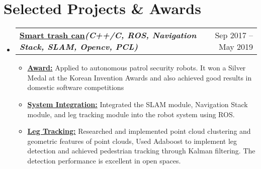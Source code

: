 \documentclass[letterpaper,11pt]{article}
\makeatletter
\newcommand{\resumeItem}[1]{
  \item\small{
    {#1 \vspace{-2pt}}
  }
}
\newcommand{\resumeProjectHeading}[2]{
    \item
    \begin{tabular*}{0.97\textwidth}{l@{\extracolsep{\fill}}r}
      \textbf{#1} & #2 \\
    \end{tabular*}\vspace{-7pt}
}
\newcommand{\resumeSubHeadingListStart}{\begin{itemize}[leftmargin=0.15in, label={}]}
\newcommand{\resumeSubHeadingListEnd}{\end{itemize}}
\newcommand{\resumeItemListStart}{\begin{itemize}}
\newcommand{\resumeItemListEnd}{\end{itemize}\vspace{-5pt}}
\makeatother
\begin{document}
\section{\textbf{Selected Projects \& Awards}}
  \vspace{3pt}
    \resumeSubHeadingListStart

      \resumeProjectHeading
        {\href{https://drive.google.com/file/d/1FCTHbe_6uXDAoiZOx13j0Z9KNvcpPl73/view?usp=sharing}{\color{blue}Smart trash can}\emph{\scriptsize{(C++/C, ROS, Navigation Stack, SLAM, Opencv, PCL)}}}{Sep 2017 -- May 2019}
          \resumeItemListStart
            \resumeItem{\underline{\textbf{Award:}} Applied to autonomous patrol security robots. It won a Silver Medal at the Korean Invention Awards and also achieved good results in domestic software competitions}
            \resumeItem{\underline{\textbf{System Integration:}} Integrated the SLAM module, Navigation Stack module, and leg tracking module into the robot system using ROS.}
            \resumeItem{\underline{\textbf{Leg Tracking:}} Researched and implemented point cloud clustering and geometric features of point clouds, Used Adaboost to implement leg detection and achieved pedestrian tracking through Kalman filtering. The detection performance is excellent in open spaces.}
          \resumeItemListEnd
    \resumeSubHeadingListEnd

%

\end{document}
